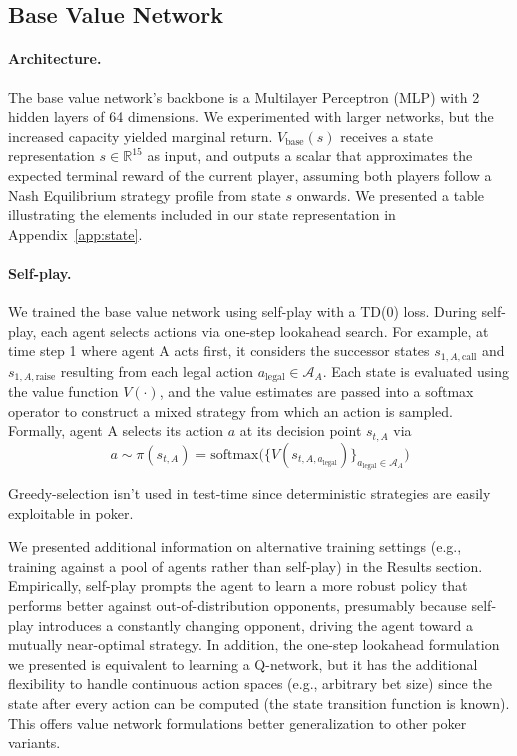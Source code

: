 \documentclass{article}
\begin{document}
\subsection{Base Value Network}

\paragraph{Architecture.}
The base value network's backbone is a Multilayer Perceptron (MLP) with 2 hidden layers of 64 dimensions. We experimented with larger networks, but the increased capacity yielded marginal return. $V_{\text{base}}(s)$ receives a state representation $s\in \mathbb{R}^{15}$ as input, and outputs a scalar that approximates the expected terminal reward of the current player, assuming both players follow a Nash Equilibrium strategy profile from state $s$ onwards. We presented a table illustrating the elements included in our state representation in Appendix~\ref{app:state}.

\paragraph{Self-play.}
We trained the base value network using self-play with a TD(0) loss. During self-play, each agent selects actions via one-step lookahead search. For example, at time step 1 where agent A acts first, it considers the successor states $s_{1,A,\text{call}}$ and $s_{1,A,\text{raise}}$ resulting from each legal action $a_{\text{legal}} \in \mathcal{A}_A$. Each state is evaluated using the value function $V(\cdot)$, and the value estimates are passed into a softmax operator to construct a mixed strategy from which an action is sampled. Formally, agent A selects its action $a$ at its decision point $s_{t,A}$ via
\begin{equation}
a \sim \pi(s_{t,A}) = \mathrm{softmax}\!\bigl(\{V(s_{t,A,a_{\text{legal}}})\}_{a_{\text{legal}}\in \mathcal{A}_A}\bigr)
\end{equation}

Greedy-selection isn't used in test-time since deterministic strategies are easily exploitable in poker.

We presented additional information on alternative training settings (e.g., training against a pool of agents rather than self-play) in the Results section. Empirically, self-play prompts the agent to learn a more robust policy that performs better against out-of-distribution opponents, presumably because self-play introduces a constantly changing opponent, driving the agent toward a mutually near-optimal strategy. In addition, the one-step lookahead formulation we presented is equivalent to learning a Q-network, but it has the additional flexibility to handle continuous action spaces (e.g., arbitrary bet size) since the state after every action can be computed (the state transition function is known). This offers value network formulations better generalization to other poker variants.
\end{document}
